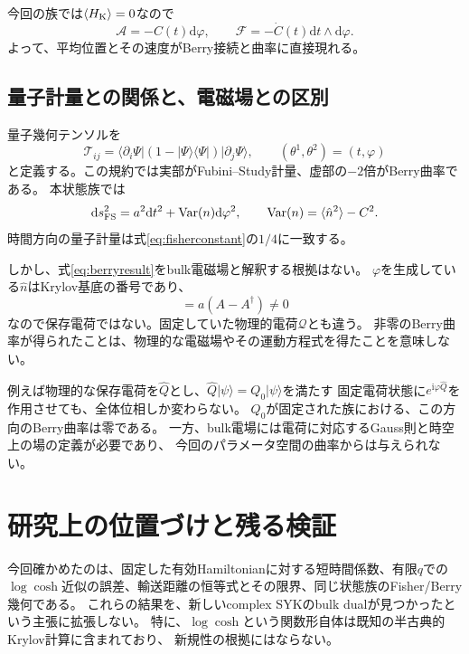\documentclass[a4paper,11pt]{ltjsarticle}
\numberwithin{equation}{section}
\newcommand{\ket}[1]{\lvert #1\rangle}
\newcommand{\bra}[1]{\langle #1\rvert}
\newcommand{\avg}[1]{\langle #1\rangle}
\newcommand{\dd}{\mathrm{d}}
\newcommand{\ii}{\mathrm{i}}
\newcommand{\Var}{\operatorname{Var}}
\begin{document}
今回の族では$\avg{H_{\rm K}}=0$なので
\begin{equation}
 \mathcal A=-C(t)\dd\varphi,\qquad
 \mathcal F=-\dot C(t)\dd t\wedge\dd\varphi.
 \label{eq:berryresult}
\end{equation}
よって、平均位置とその速度がBerry接続と曲率に直接現れる。

\subsection{量子計量との関係と、電磁場との区別}
量子幾何テンソルを
\begin{equation}
 \mathcal T_{ij}=\bra{\partial_i\Psi}
 (1-\ket\Psi\bra\Psi)\ket{\partial_j\Psi},\qquad
 (\theta^1,\theta^2)=(t,\varphi)
 \label{eq:qgt}
\end{equation}
と定義する。この規約では実部がFubini--Study計量、虚部の$-2$倍がBerry曲率である。
本状態族では
\begin{equation}
 \dd s_{\rm FS}^2=a^2\dd t^2+\Var(n)\dd\varphi^2,
 \qquad \Var(n)=\avg{\hat n^2}-C^2.
 \label{eq:quantummetric}
\end{equation}
時間方向の量子計量は式\eqref{eq:fisherconstant}の$1/4$に一致する。

しかし、式\eqref{eq:berryresult}をbulk電磁場と解釈する根拠はない。
$\varphi$を生成している$\hat n$はKrylov基底の番号であり、
\begin{equation}
 [H_{\rm K},\hat n]=a(A-A^\dagger)\neq0
 \label{eq:notcharge}
\end{equation}
なので保存電荷ではない。固定していた物理的電荷$\mathcal Q$とも違う。
非零のBerry曲率が得られたことは、物理的な電磁場やその運動方程式を得たことを意味しない。

例えば物理的な保存電荷を$\widehat Q$とし、$\widehat Q\ket\psi=Q_0\ket\psi$を満たす
固定電荷状態に$e^{\ii\varphi\widehat Q}$を作用させても、全体位相しか変わらない。
$Q_0$が固定された族における、この方向のBerry曲率は零である。
一方、bulk電場には電荷に対応するGauss則と時空上の場の定義が必要であり、
今回のパラメータ空間の曲率からは与えられない。

\section{研究上の位置づけと残る検証}
今回確かめたのは、固定した有効Hamiltonianに対する短時間係数、有限$q$での
$\log\cosh$近似の誤差、輸送距離の恒等式とその限界、同じ状態族のFisher/Berry幾何である。
これらの結果を、新しいcomplex SYKのbulk dualが見つかったという主張に拡張しない。
特に、$\log\cosh$という関数形自体は既知の半古典的Krylov計算に含まれており\cite{Ambrosini}、
新規性の根拠にはならない。
\end{document}
